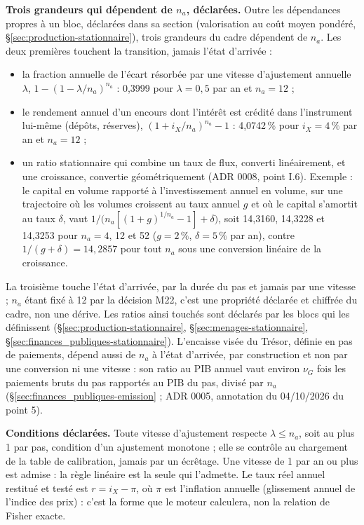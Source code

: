 \documentclass[11pt,a4paper]{article}
\begin{document}
\textbf{Trois grandeurs qui dépendent de $n_a$, déclarées.} Outre les dépendances propres à un bloc, déclarées dans sa section (valorisation au coût moyen pondéré, \S\ref{sec:production-stationnaire}), trois grandeurs du cadre dépendent de $n_a$. Les deux premières touchent la transition, jamais l'état d'arrivée :
\begin{itemize}
\item la fraction annuelle de l'écart résorbée par une vitesse d'ajustement annuelle $\lambda$, $1 - (1 - \lambda/n_a)^{n_a}$ : 0,3999 pour $\lambda = 0{,}5$ par an et $n_a = 12$ ;
\item le rendement annuel d'un encours dont l'intérêt est crédité dans l'instrument lui-même (dépôts, réserves), $(1 + i_X/n_a)^{n_a} - 1$ : 4,0742\,\% pour $i_X = 4\,\%$ par an et $n_a = 12$ ;
\item un ratio stationnaire qui combine un taux de flux, converti linéairement, et une croissance, convertie géométriquement (ADR 0008, point I.6). Exemple : le capital en volume rapporté à l'investissement annuel en volume, sur une trajectoire où les volumes croissent au taux annuel $g$ et où le capital s'amortit au taux $\delta$, vaut $1/\bigl(n_a[(1 + g)^{1/n_a} - 1] + \delta\bigr)$, soit 14,3160, 14,3228 et 14,3253 pour $n_a = 4$, 12 et 52 ($g = 2\,\%$, $\delta = 5\,\%$ par an), contre $1/(g + \delta) = 14{,}2857$ pour tout $n_a$ sous une conversion linéaire de la croissance.
\end{itemize}
La troisième touche l'état d'arrivée, par la durée du pas et jamais par une vitesse ; $n_a$ étant fixé à 12 par la décision M22, c'est une propriété déclarée et chiffrée du cadre, non une dérive. Les ratios ainsi touchés sont déclarés par les blocs qui les définissent (\S\ref{sec:production-stationnaire}, \S\ref{sec:menages-stationnaire}, \S\ref{sec:finances_publiques-stationnaire}). L'encaisse visée du Trésor, définie en pas de paiements, dépend aussi de $n_a$ à l'état d'arrivée, par construction et non par une conversion ni une vitesse : son ratio au PIB annuel vaut environ $\nu_G$ fois les paiements bruts du pas rapportés au PIB du pas, divisé par $n_a$ (\S\ref{sec:finances_publiques-emission} ; ADR 0005, annotation du 04/10/2026 du point 5).

\begin{proposee}
\textbf{Conditions déclarées.} Toute vitesse d'ajustement respecte $\lambda \le n_a$, soit au plus 1 par pas, condition d'un ajustement monotone ; elle se contrôle au chargement de la table de calibration, jamais par un écrêtage. Une vitesse de 1 par an ou plus est admise : la règle linéaire est la seule qui l'admette. Le taux réel annuel restitué et testé est $r = i_X - \pi$, où $\pi$ est l'inflation annuelle (glissement annuel de l'indice des prix) : c'est la forme que le moteur calculera, non la relation de Fisher exacte.
\end{proposee}
\end{document}
